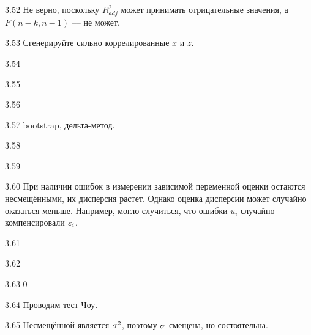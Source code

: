 \protect \hypertarget {soln:3.52}{}
\begin{solution}{{3.52}}
Не верно, поскольку $R_{adj}^2$ может принимать отрицательные значения, а $F(n-k, n-1)$ --– не может.
\end{solution}
\protect \hypertarget {soln:3.53}{}
\begin{solution}{{3.53}}
Сгенерируйте сильно коррелированные $x$ и $z$.
\end{solution}
\protect \hypertarget {soln:3.54}{}
\begin{solution}{{3.54}}
\end{solution}
\protect \hypertarget {soln:3.55}{}
\begin{solution}{{3.55}}
\end{solution}
\protect \hypertarget {soln:3.56}{}
\begin{solution}{{3.56}}
\end{solution}
\protect \hypertarget {soln:3.57}{}
\begin{solution}{{3.57}}
bootstrap, дельта-метод.
\end{solution}
\protect \hypertarget {soln:3.58}{}
\begin{solution}{{3.58}}
\end{solution}
\protect \hypertarget {soln:3.59}{}
\begin{solution}{{3.59}}
\end{solution}
\protect \hypertarget {soln:3.60}{}
\begin{solution}{{3.60}}
При наличии ошибок в измерении зависимой переменной оценки остаются несмещёнными, их дисперсия растет. Однако оценка дисперсии может случайно оказаться меньше. Например, могло случиться, что ошибки $u_i$ случайно компенсировали $\varepsilon_i$.
\end{solution}
\protect \hypertarget {soln:3.61}{}
\begin{solution}{{3.61}}
\end{solution}
\protect \hypertarget {soln:3.62}{}
\begin{solution}{{3.62}}
\end{solution}
\protect \hypertarget {soln:3.63}{}
\begin{solution}{{3.63}}
$0$
\end{solution}
\protect \hypertarget {soln:3.64}{}
\begin{solution}{{3.64}}
Проводим тест Чоу.
\end{solution}
\protect \hypertarget {soln:3.65}{}
\begin{solution}{{3.65}}
Несмещённой является $\sigma^2$, поэтому $\sigma$ смещена, но состоятельна.
\end{solution}
